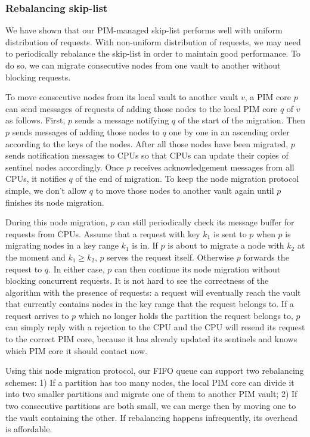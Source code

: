 \subsubsection{Rebalancing skip-list}
We have shown that our PIM-managed skip-list performs well with uniform distribution of requests. 
With non-uniform distribution of requests, we may need to periodically rebalance the skip-list 
in order to maintain good performance. 
To do so, we can migrate consecutive nodes from one vault to another without blocking requests.  

To move consecutive nodes from its local vault to another vault $v$, a PIM core $p$ 
can send messages of requests of adding those nodes to the local PIM core $q$ of $v$ as follows. 
First, $p$ sends a message notifying $q$ of the start of the migration. 
Then $p$ sends messages of adding those nodes to $q$ one by one in an ascending order 
according to the keys of the nodes. 
After all those nodes have been migrated, $p$ sends notification messages to CPUs so that 
CPUs can update their copies of sentinel nodes accordingly.
Once $p$ receives acknowledgement messages from all CPUs, it notifies $q$ of the end of migration.
To keep the node migration protocol simple, we don't allow $q$ to move those nodes 
to another vault again until $p$ finishes its node migration. 

During this node migration, $p$ can still periodically check its message buffer for requests from CPUs.
Assume that a request with key $k_1$ is sent to $p$ when $p$ is migrating nodes 
in a key range $k_1$ is in.  
If $p$ is about to migrate a node with $k_2$ at the moment and $k_1 \ge k_2$, 
$p$ serves the request itself. 
Otherwise $p$ forwards the request to $q$. 
In either case, $p$ can then continue its node migration without blocking concurrent requests. 
It is not hard to see the correctness of the algorithm with the presence of requests: 
a request will eventually reach the vault that 
currently contains nodes in the key range that the request belongs to.
If a request arrives to $p$ which no longer holds the partition the request belongs to, 
$p$ can simply reply with a rejection to the CPU and the CPU will resend its request to 
the correct PIM core, 
because it has already updated its sentinels and knows which PIM core it should contact now. 

Using this node migration protocol, our FIFO queue can support two rebalancing schemes:
1) If a partition has too many nodes, the local PIM core can divide it into two smaller  
partitions and migrate one of them to another PIM vault; 
2) If two consecutive partitions are both small, 
we can merge then by moving one to the vault containing the other. 
If rebalancing happens infrequently, its overhead is affordable. 

